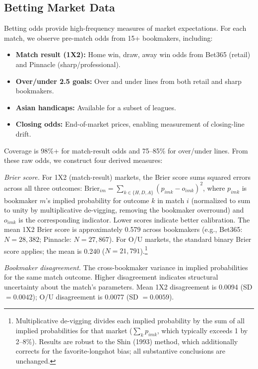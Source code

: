 \documentclass[12pt]{article}
\begin{document}
\subsection{Betting Market Data}

Betting odds provide high-frequency measures of market expectations. For each match, we observe pre-match odds from 15+ bookmakers, including:

\begin{itemize}[leftmargin=*]
\item \textbf{Match result (1X2):} Home win, draw, away win odds from Bet365 (retail) and Pinnacle (sharp/professional).
\item \textbf{Over/under 2.5 goals:} Over and under lines from both retail and sharp bookmakers.
\item \textbf{Asian handicaps:} Available for a subset of leagues.
\item \textbf{Closing odds:} End-of-market prices, enabling measurement of closing-line drift.
\end{itemize}

Coverage is 98\%+ for match-result odds and 75--85\% for over/under lines. From these raw odds, we construct four derived measures:

\textit{Brier score.} For 1X2 (match-result) markets, the Brier score sums squared errors across all three outcomes: $\text{Brier}_{im} = \sum_{k \in \{H,D,A\}} (p_{imk} - o_{imk})^2$, where $p_{imk}$ is bookmaker $m$'s implied probability for outcome $k$ in match $i$ (normalized to sum to unity by multiplicative de-vigging, removing the bookmaker overround) and $o_{imk}$ is the corresponding indicator. Lower scores indicate better calibration. The mean 1X2 Brier score is approximately 0.579 across bookmakers (e.g., Bet365: $N = 28{,}382$; Pinnacle: $N = 27{,}867$). For O/U markets, the standard binary Brier score applies; the mean is 0.240 ($N = 21{,}791$).\footnote{Multiplicative de-vigging divides each implied probability by the sum of all implied probabilities for that market ($\sum_k p_{imk}$, which typically exceeds 1 by 2--8\%). Results are robust to the Shin (1993) method, which additionally corrects for the favorite-longshot bias; all substantive conclusions are unchanged.}

\textit{Bookmaker disagreement.} The cross-bookmaker variance in implied probabilities for the same match outcome. Higher disagreement indicates structural uncertainty about the match's parameters. Mean 1X2 disagreement is 0.0094 (SD $= 0.0042$); O/U disagreement is 0.0077 (SD $= 0.0059$).
\end{document}
